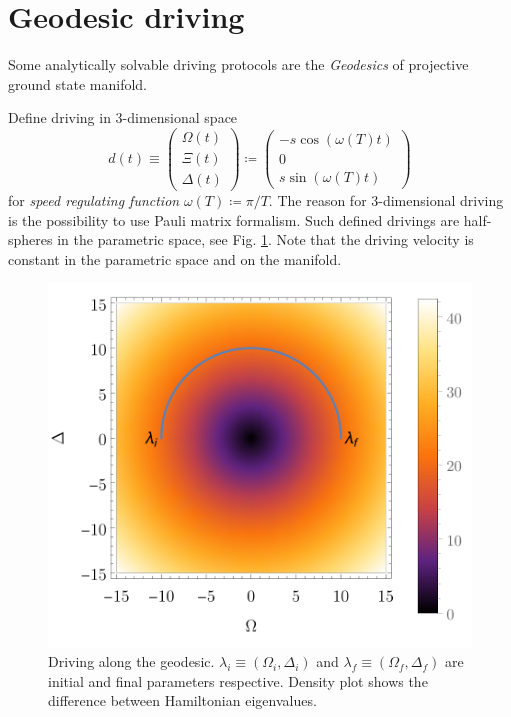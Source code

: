 \section{Geodesic driving}
Some analytically solvable driving protocols are the \emph{Geodesics} of projective ground state manifold. 

Define driving in 3-dimensional space
\begin{equation}
    d(t)\equiv \begin{pmatrix}
        \Omega(t)\\
        \Xi(t)\\
        \Delta(t)
    \end{pmatrix}\coloneqq \begin{pmatrix}
        -s \cos(\omega(T)t)\\
        0\\
        s \sin(\omega(T)t)
    \end{pmatrix}
\end{equation}
for \emph{speed regulating function} $\omega(T)\coloneqq \pi/T$. The reason for 3-dimensional driving is the possibility to use Pauli matrix formalism. Such defined drivings are half-spheres in the parametric space, see Fig. \ref{fig:driving}. Note that the driving velocity is constant in the parametric space and on the manifold.

\begin{figure}[H]
    \centering
    \includegraphics[scale=1.2]{../img/driving.pdf}
    \caption{Driving along the geodesic. $\lambda_i\equiv (\Omega_i,\Delta_i)$ and $\lambda_f\equiv (\Omega_f,\Delta_f)$ are initial and final parameters respective. Density plot shows the difference between Hamiltonian eigenvalues.}
    \label{fig:driving}
\end{figure}

